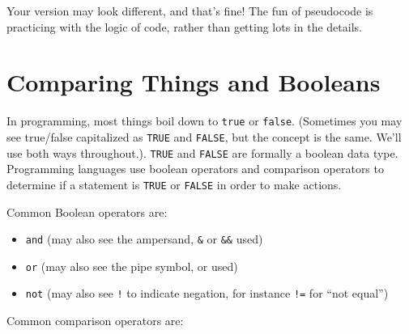 \documentclass[
]{book}
\providecommand{\tightlist}{%
  \setlength{\itemsep}{0pt}\setlength{\parskip}{0pt}}
\begin{document}
Your version may look different, and that's fine! The fun of pseudocode is practicing with the logic of code, rather than getting lots in the details.

\hfill\break

\section{Comparing Things and Booleans}\label{comparing-things-and-booleans}

In programming, most things boil down to \texttt{true} or \texttt{false}. (Sometimes you may see true/false capitalized as \texttt{TRUE} and \texttt{FALSE}, but the concept is the same. We'll use both ways throughout.). \texttt{TRUE} and \texttt{FALSE} are formally a boolean data type. Programming languages use boolean operators and comparison operators to determine if a statement is \texttt{TRUE} or \texttt{FALSE} in order to make actions.

Common Boolean operators are:\\

\begin{itemize}
\tightlist
\item
  \texttt{and} (may also see the ampersand, \texttt{\&} or \texttt{\&\&} used)
\item
  \texttt{or} (may also see the pipe symbol, \texttt{\textbar{}} or \texttt{\textbar{}\textbar{}} used)
\item
  \texttt{not} (may also see \texttt{!} to indicate negation, for instance \texttt{!=} for ``not equal'')
\end{itemize}

Common comparison operators are:
\end{document}
